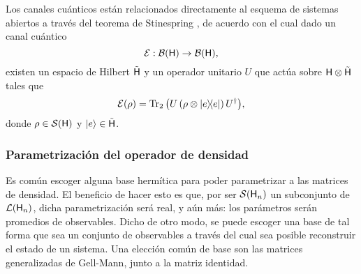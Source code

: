 Los canales cuánticos están relacionados directamente al esquema de sistemas abiertos a través del teorema de Stinespring \cite{Watrous}, de acuerdo con el cual dado un canal cuántico
\begin{equation}
    \mathcal{E}:\mathcal{B}({\sf H})\rightarrow \mathcal{B}({\sf H}),\nonumber
\end{equation}    
existen un espacio de Hilbert $\tilde {{\sf H}}$ y un operador unitario $U$ que actúa sobre ${\sf H}\otimes \tilde {{\sf H}}$ tales que
\begin{equation}
    \mcE(\rho)=\Tr_{2}\qty(U  \left(\rho \otimes \dyad{e}{e}\right) U^{\dag}),\nonumber
\end{equation}
donde $\rho\in\mathcal{S}({\sf H})$ y $\ket{e}\in \tilde {{\sf H}}$. \acnote{\checkmark}

\subsubsection{Parametrización del operador de densidad}


Es común escoger alguna base hermítica para poder parametrizar a las matrices de densidad. El beneficio de hacer esto es que, por ser $\mathcal{S}({\sf H}_{n})$ un subconjunto de $\mathcal{L}({\sf H}_{n})$, dicha parametrización será real, y aún más: los parámetros serán promedios de observables. Dicho de otro modo, se puede escoger una base de tal forma que sea un conjunto de observables a través del cual sea posible reconstruir el estado de un sistema. Una elección común de base son las matrices generalizadas de Gell-Mann, junto a la matriz identidad.

